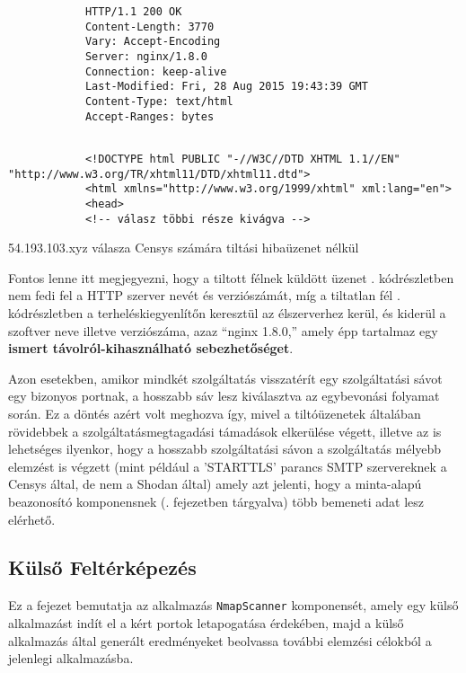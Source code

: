 	\begin{listing}[H]
		\begin{verbatim}
			HTTP/1.1 200 OK
			Content-Length: 3770
			Vary: Accept-Encoding
			Server: nginx/1.8.0
			Connection: keep-alive
			Last-Modified: Fri, 28 Aug 2015 19:43:39 GMT
			Content-Type: text/html
			Accept-Ranges: bytes
		\end{verbatim}
		\vspace{-5pt}
		\begin{verbatim}
			 
			<!DOCTYPE html PUBLIC "-//W3C//DTD XHTML 1.1//EN" "http://www.w3.org/TR/xhtml11/DTD/xhtml11.dtd">
			<html xmlns="http://www.w3.org/1999/xhtml" xml:lang="en">
			<head>
			<!-- válasz többi része kivágva -->
		\end{verbatim}
		\caption{54.193.103.xyz válasza Censys számára tiltási hibaüzenet nélkül}
		\label{censysnoban_hu}
	\end{listing}
	
	Fontos lenne itt megjegyezni, hogy a tiltott félnek küldött üzenet \az{\ref{shodanban_hu}}. kódrészletben nem fedi fel a HTTP szerver nevét és verziószámát, míg a tiltatlan fél \az{\ref{censysnoban_hu}}. kódrészletben a terheléskiegyenlítőn keresztül az élszerverhez kerül, és kiderül a szoftver neve illetve verziószáma, azaz ``nginx 1.8.0,'' amely épp tartalmaz egy \textbf{ismert távolról-kihasználható sebezhetőséget}\cite{nginxcve}.
	
	Azon esetekben, amikor mindkét szolgáltatás visszatérít egy szolgáltatási sávot egy bizonyos portnak, a hosszabb sáv lesz kiválasztva az egybevonási folyamat során. Ez a döntés azért volt meghozva így, mivel a tiltóüzenetek általában rövidebbek\cite{qualys11} a szolgáltatásmegtagadási támadások elkerülése végett, illetve az is lehetséges ilyenkor, hogy a hosszabb szolgáltatási sávon a szolgáltatás mélyebb elemzést is végzett (mint például a 'STARTTLS' parancs SMTP szervereknek a Censys által, de nem a Shodan által) amely azt jelenti, hogy a minta-alapú beazonosító komponensnek (\az{\ref{patternmatch}}. fejezetben tárgyalva) több bemeneti adat lesz elérhető.

\subsection*{Külső Feltérképezés}

	Ez a fejezet bemutatja az alkalmazás \texttt{NmapScanner} komponensét, amely egy külső alkalmazást indít el a kért portok letapogatása érdekében, majd a külső alkalmazás által generált eredményeket beolvassa további elemzési célokból a jelenlegi alkalmazásba.
	
